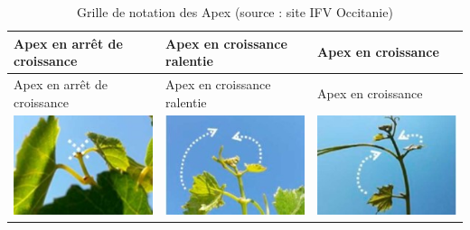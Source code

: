 \documentclass[
  a4paperpaper,
  DIV=11,
  numbers=noendperiod]{scrartcl}
\begin{document}
\begin{longtable}[]{@{}
  >{\raggedright\arraybackslash}p{}
  >{\raggedright\arraybackslash}p{}
  >{\raggedright\arraybackslash}p{}@{}}
\caption{Grille de notation des Apex (source : site IFV
Occitanie)}\tabularnewline
\toprule\noalign{}
\begin{minipage}[b]{\linewidth}\raggedright
Apex en arrêt de croissance
\end{minipage} & \begin{minipage}[b]{\linewidth}\raggedright
Apex en croissance ralentie
\end{minipage} & \begin{minipage}[b]{\linewidth}\raggedright
Apex en croissance
\end{minipage} \\
\midrule\noalign{}
\endfirsthead
\toprule\noalign{}
\begin{minipage}[b]{\linewidth}\raggedright
Apex en arrêt de croissance
\end{minipage} & \begin{minipage}[b]{\linewidth}\raggedright
Apex en croissance ralentie
\end{minipage} & \begin{minipage}[b]{\linewidth}\raggedright
Apex en croissance
\end{minipage} \\
\midrule\noalign{}
\endhead
\bottomrule\noalign{}
\endlastfoot
\includegraphics[width=2.08333in,height=\textheight,keepaspectratio]{images/apex0.jpg}
&
\includegraphics[width=2.08333in,height=\textheight,keepaspectratio]{images/apex1.jpg}
&
\includegraphics[width=2.08333in,height=\textheight,keepaspectratio]{images/apex2.jpg} \\

\end{longtable}
\end{document}
